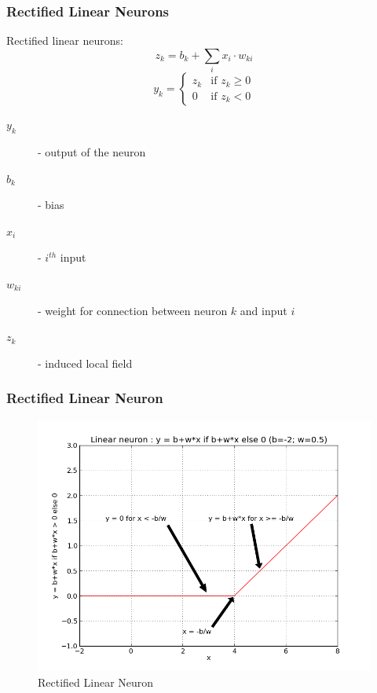 \begin{frame}
  \frametitle{Rectified Linear Neurons}
  \begin{definition}
    \alert{Rectified linear neurons}:
    \begin{equation}
      \label{eq:rectified-linear-neuron-1}
      z_k = b_k + \displaystyle\sum_{i}x_i\cdot w_{ki}
    \end{equation}
    \begin{equation}
      \label{eq:rectified-linear-neuron-2}
      y_k = \begin{cases} z_k & \text{if } z_k \ge 0 \\ 0 & \text{if } z_k < 0 \end{cases}
    \end{equation}
    \begin{description}
    \item[$y_k$] - output of the neuron
    \item[$b_k$] - bias
    \item[$x_i$] - $i^{th}$ input
    \item[$w_{ki}$] - weight for connection between neuron $k$ and input $i$
    \item[$z_k$] - induced local field
    \end{description}
  \end{definition}
\end{frame}

\begin{frame}
  \frametitle{Rectified Linear Neuron}
  \begin{figure}[h!]
    \centering
    \includegraphics[height = .7\textheight]{graphics/rectified_linear_neuron.png}
    \caption{Rectified Linear Neuron}
  \end{figure}
\end{frame}


